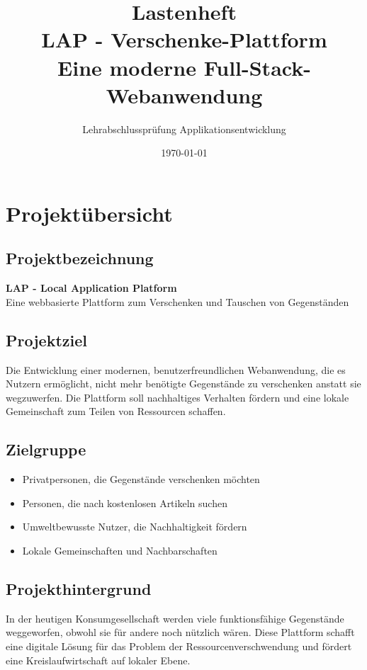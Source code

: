 \documentclass[a4paper,12pt]{article}
\title{
    \huge\textbf{Lastenheft}\\
    \Large LAP - Verschenke-Plattform\\
    \large Eine moderne Full-Stack-Webanwendung
}
\author{Lehrabschlussprüfung Applikationsentwicklung}
\date{\today}
\begin{document}
\maketitle

\newpage

\tableofcontents

\newpage

\section{Projektübersicht}

\subsection{Projektbezeichnung}
\textbf{LAP - Local Application Platform}\\
Eine webbasierte Plattform zum Verschenken und Tauschen von Gegenständen

\subsection{Projektziel}
Die Entwicklung einer modernen, benutzerfreundlichen Webanwendung, die es Nutzern ermöglicht, nicht mehr benötigte Gegenstände zu verschenken anstatt sie wegzuwerfen. Die Plattform soll nachhaltiges Verhalten fördern und eine lokale Gemeinschaft zum Teilen von Ressourcen schaffen.

\subsection{Zielgruppe}
\begin{itemize}
    \item Privatpersonen, die Gegenstände verschenken möchten
    \item Personen, die nach kostenlosen Artikeln suchen
    \item Umweltbewusste Nutzer, die Nachhaltigkeit fördern
    \item Lokale Gemeinschaften und Nachbarschaften
\end{itemize}

\subsection{Projekthintergrund}
In der heutigen Konsumgesellschaft werden viele funktionsfähige Gegenstände weggeworfen, obwohl sie für andere noch nützlich wären. Diese Plattform schafft eine digitale Lösung für das Problem der Ressourcenverschwendung und fördert eine Kreislaufwirtschaft auf lokaler Ebene.
\end{document}
